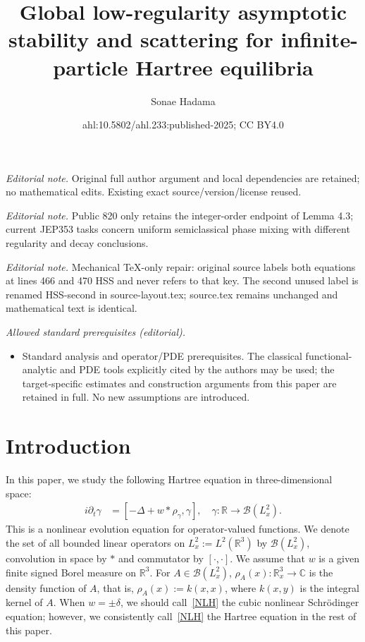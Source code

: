 \documentclass[10pt,a4paper]{amsart}
\title{Global low-regularity asymptotic stability and scattering for infinite-particle Hartree equilibria}
\author{Sonae Hadama}
\date{ahl:10.5802/ahl.233:published-2025; CC BY4.0}
\newcommand{\BC}{\mathbb{C}}
\newcommand{\BR}{\mathbb{R}}
\newcommand{\CB}{\mathcal{B}}
\newcommand{\ga}{\gamma}
\newcommand{\de}{\delta}
\newcommand{\rh}{\rho}
\newcommand{\pl}{\partial}
\begin{document}
\maketitle
\noindent\textit{Editorial note.} Original full author argument and local dependencies are retained; no mathematical edits. Existing exact source/version/license reused.\par\medskip
\noindent\textit{Editorial note.} Public 820 only retains the integer-order endpoint of Lemma 4.3; current JEP353 tasks concern uniform semiclassical phase mixing with different regularity and decay conclusions.\par\medskip
\noindent\textit{Editorial note.} Mechanical TeX-only repair: original source labels both equations at lines 466 and 470 HSS and never refers to that key. The second unused label is renamed HSS-second in source-layout.tex; source.tex remains unchanged and mathematical text is identical.\par\medskip
\noindent\textit{Allowed standard prerequisites (editorial).}\begin{itemize}
\item Standard analysis and operator/PDE prerequisites. The classical functional-analytic and PDE tools explicitly cited by the authors may be used; the target-specific estimates and construction arguments from this paper are retained in full. No new assumptions are introduced.
\end{itemize}\medskip
\section{Introduction} 
In this paper, we study the following Hartree equation in three-dimensional space:
\begin{align}\label{NLH}
\tag{NLH} 
i \pl_t \ga &= [- \Delta + w \ast \rho_\ga, \ga], \quad \ga:\BR \to \CB(L^2_x).
\end{align}
This is a nonlinear evolution equation for operator-valued functions. We denote the set of all bounded linear operators on $L^2_x := L^2(\BR^3)$ by $\CB(L^2_x)$, convolution in space by $\ast$ and commutator by $[\cdot, \cdot]$. We assume that $w$ is a given finite signed Borel measure on $\BR^3$. For $A \in \CB(L^2_x)$, $\rh_A(x) : \BR^3_x \to \BC$ is the density function of $A$, that is, $\rh_A(x):=k(x,x)$, where $k(x,y)$ is the integral kernel of $A$. When $w = \pm \de$, we should call~\eqref{NLH} the cubic nonlinear Schr\"odinger equation; however, we consistently call~\eqref{NLH} the Hartree equation in the rest of this paper.
\end{document}
